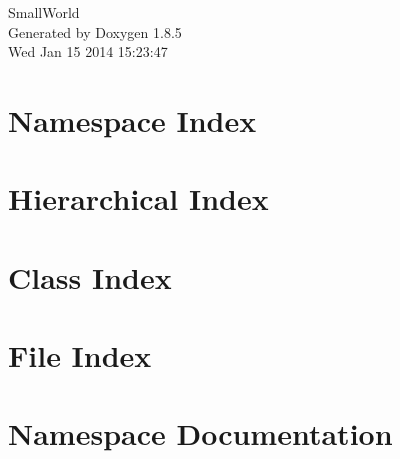 \documentclass[twoside]{book}
\newcommand{\clearemptydoublepage}{%
  \newpage{\pagestyle{empty}\cleardoublepage}%
}
\begin{document}
\hypersetup{pageanchor=false}
\begin{titlepage}
\vspace*{7cm}
\begin{center}%
{\Large Small\-World }\\
\vspace*{1cm}
{\large Generated by Doxygen 1.8.5}\\
\vspace*{0.5cm}
{\small Wed Jan 15 2014 15:23:47}\\
\end{center}
\end{titlepage}
\clearemptydoublepage
\tableofcontents
\clearemptydoublepage
{}
\hypersetup{pageanchor=true}

\chapter{Namespace Index}

\chapter{Hierarchical Index}

\chapter{Class Index}

\chapter{File Index}

\chapter{Namespace Documentation}


\end{document}
